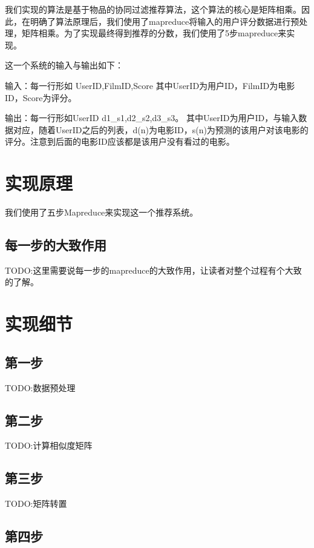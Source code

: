 \documentclass[forprint]{myreport}
\begin{document}
我们实现的算法是基于物品的协同过滤推荐算法，这个算法的核心是矩阵相乘。因此，在明确了算法原理后，我们使用了mapreduce将输入的用户评分数据进行预处理，矩阵相乘。为了实现最终得到推荐的分数，我们使用了5步mapreduce来实现。

这一个系统的输入与输出如下：

输入：每一行形如 UserID,FilmID,Score
其中UserID为用户ID，FilmID为电影ID，Score为评分。

输出：每一行形如UserID d1\_s1,d2\_s2,d3\_s3。
其中UserID为用户ID，与输入数据对应，随着UserID之后的列表，d(n)为电影ID，s(n)为预测的该用户对该电影的评分。注意到后面的电影ID应该都是该用户没有看过的电影。

\section{实现原理}

我们使用了五步Mapreduce来实现这一个推荐系统。

\subsection{每一步的大致作用}

TODO:这里需要说每一步的mapreduce的大致作用，让读者对整个过程有个大致的了解。

\section{实现细节}



\subsection{第一步}

TODO:数据预处理

\subsection{第二步}

TODO:计算相似度矩阵

\subsection{第三步}

TODO:矩阵转置

\subsection{第四步}
\end{document}
